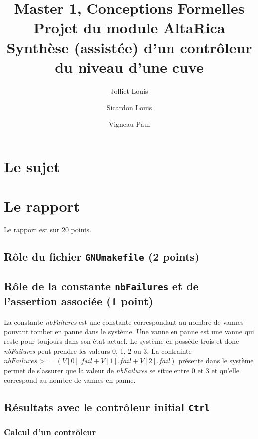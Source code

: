 \documentclass[a4paper]{book}
\newcommand{\altarica}{{\sc AltaRica}}
\begin{document}
\title{Master 1, Conceptions Formelles\\
Projet du module \altarica\\
Synthèse (assistée) d'un contrôleur du niveau d'une cuve}

\date{}

\author{Jolliet Louis \and Sicardon Louis \and Vigneau Paul}

\maketitle

\chapter{Le sujet}


\chapter{Le rapport}
Le rapport est sur 20 points.

\section{Rôle du fichier {\tt GNUmakefile} (2 points)}

\section{Rôle de la constante {\tt nbFailures} et de l'assertion associée (1 point)}
La constante \textit{nbFailures} est une constante correspondant au nombre de vannes pouvant tomber en panne dans le système. Une vanne en panne est une vanne qui reste pour toujours dans son état actuel. Le système en possède trois et donc \textit{nbFailures} peut prendre les valeurs 0, 1, 2 ou 3. La contrainte $nbFailures >= (V [0].fail + V [1].fail + V [2].fail)$ présente dans le système permet de s’assurer que la valeur de \textit{nbFailures} se situe entre 0 et 3 et qu’elle correspond au nombre de vannes en panne.

\section{Résultats avec le contrôleur initial {\tt Ctrl}}
\subsection{Calcul d'un contrôleur}
\end{document}
